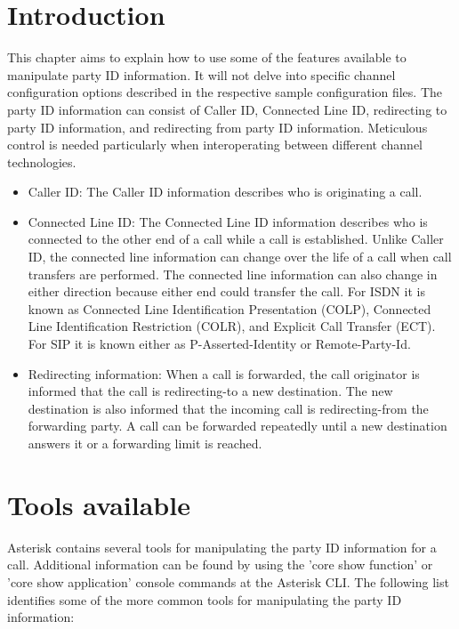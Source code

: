 \section{Introduction}

This chapter aims to explain how to use some of the features available to
manipulate party ID information.  It will not delve into specific channel
configuration options described in the respective sample configuration
files.  The party ID information can consist of Caller ID, Connected Line
ID, redirecting to party ID information, and redirecting from party ID
information.  Meticulous control is needed particularly when
interoperating between different channel technologies.

\begin{itemize}

\item Caller ID: The Caller ID information describes who is originating a
call.

\item Connected Line ID: The Connected Line ID information describes who
is connected to the other end of a call while a call is established.
Unlike Caller ID, the connected line information can change over the life
of a call when call transfers are performed.  The connected line
information can also change in either direction because either end could
transfer the call.  For ISDN it is known as Connected Line Identification
Presentation (COLP), Connected Line Identification Restriction (COLR), and
Explicit Call Transfer (ECT).  For SIP it is known either as
P-Asserted-Identity or Remote-Party-Id.

\item Redirecting information: When a call is forwarded, the call
originator is informed that the call is redirecting-to a new destination.
The new destination is also informed that the incoming call is
redirecting-from the forwarding party.  A call can be forwarded repeatedly
until a new destination answers it or a forwarding limit is reached.

\end{itemize}

\section{Tools available}

Asterisk contains several tools for manipulating the party ID information
for a call.  Additional information can be found by using the 'core show
function' or 'core show application' console commands at the Asterisk CLI.
The following list identifies some of the more common tools for
manipulating the party ID information:

